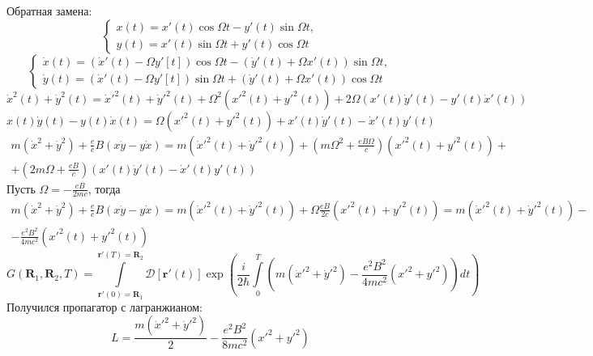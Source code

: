 \documentclass[12pt]{article}
\theoremstyle{definition}
\begin{document}
Обратная замена:
\begin{equation}
    \begin{cases}
        x(t)=x'(t)\cos\Omega t-y'(t)\sin\Omega t,\\
        y(t)=x'(t)\sin\Omega t+y'(t)\cos\Omega t
    \end{cases}
\end{equation}
\begin{equation}
    \begin{cases}
        \dot{x}(t)=(\dot{x}'(t)-\Omega y'[t])\cos\Omega t-(\dot{y}'(t)+\Omega x'(t))\sin\Omega t,\\
        \dot{y}(t)=(\dot{x}'(t)-\Omega y'[t])\sin\Omega t+(\dot{y}'(t)+\Omega x'(t))\cos\Omega t
    \end{cases}
\end{equation}
\begin{equation}
    \dot{x}^2(t)+\dot{y}^2(t)=\dot{x}'^2(t)+\dot{y}'^2(t)+\Omega^2(x'^2(t)+y'^2(t))+2\Omega(x'(t)\dot{y}'(t)-y'(t)\dot{x}'(t))
\end{equation}
\begin{equation}
    x(t)\dot{y}(t)-y(t)\dot{x}(t)=\Omega(x'^2(t)+y'^2(t))+x'(t)\dot{y}'(t)-\dot{x}'(t)y'(t)
\end{equation}
\begin{multline}
    m(\dot{x}^2+\dot{y}^2)+\frac{e}{c}B(x\dot{y}-y\dot{x})=m(\dot{x}'^2(t)+\dot{y}'^2(t))+\left(m\Omega^2+\frac{eB\Omega}{c}\right)(x'^2(t)+y'^2(t))+\\+\left(2m\Omega+\frac{eB}{c}\right)(x'(t)\dot{y}'(t)-\dot{x}'(t)y'(t))
\end{multline}
Пусть $\Omega=-\frac{eB}{2mc}$, тогда
\begin{multline}
    m(\dot{x}^2+\dot{y}^2)+\frac{e}{c}B(x\dot{y}-y\dot{x})=m(\dot{x}'^2(t)+\dot{y}'^2(t))+\Omega\frac{eB}{2c}(x'^2(t)+y'^2(t))=m(\dot{x}'^2(t)+\dot{y}'^2(t))-\\-\frac{e^2B^2}{4mc^2}(x'^2(t)+y'^2(t))
\end{multline}
\begin{equation}
    G(\textbf{R}_1,\textbf{R}_2,T)=\int\limits_{\textbf{r}'(0)=\textbf{R}_1}^{\textbf{r}'(T)=\textbf{R}_2}\mathcal{D}[\textbf{r}'(t)]\exp\left(\frac{i}{2\hbar}\int\limits_0^T\left(m(\dot{x}'^2+\dot{y}'^2)-\frac{e^2B^2}{4mc^2}(x'^2+y'^2)\right)dt\right)
\end{equation}
Получился пропагатор с лагранжианом:
\begin{equation}
    L=\frac{m(\dot{x}'^2+\dot{y}'^2)}{2}-\frac{e^2B^2}{8mc^2}(x'^2+y'^2)
\end{equation}
\end{document}
